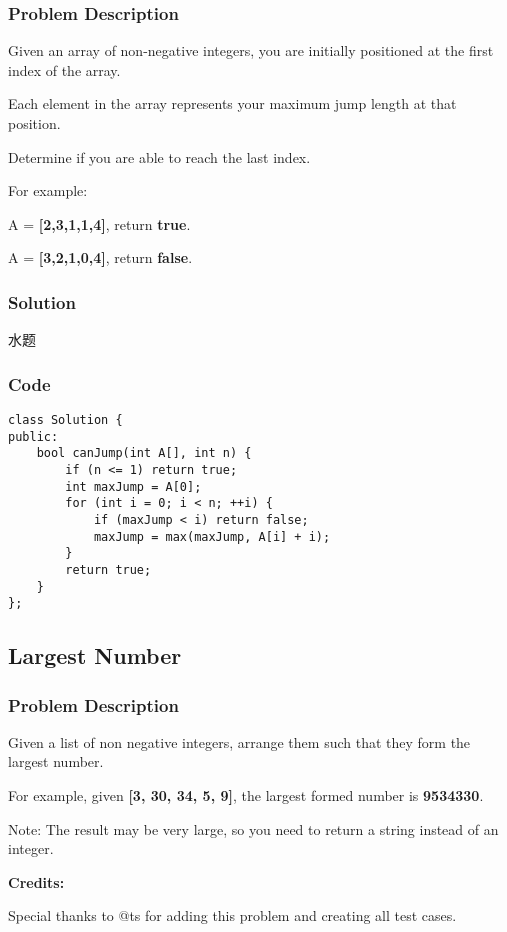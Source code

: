 \documentclass[courier]{article}
\begin{document}
\begin{CJK*}{UTF8}{gkai}
\subsubsection*{Problem Description}
Given an array of non-negative integers, you are initially positioned at the first index of the array.

Each element in the array represents your maximum jump length at that position.

Determine if you are able to reach the last index.

For example:


A = \textbf{[2,3,1,1,4]}, return \textbf{true}.

A = \textbf{[3,2,1,0,4]}, return \textbf{false}.



\subsubsection*{Solution}
水题

\subsubsection*{Code}
\begin{lstlisting}
class Solution {
public:
    bool canJump(int A[], int n) {
        if (n <= 1) return true;
        int maxJump = A[0];
        for (int i = 0; i < n; ++i) {
            if (maxJump < i) return false;
            maxJump = max(maxJump, A[i] + i);
        }
        return true;
    }
}; 
\end{lstlisting}


\subsection{ Largest Number }

\subsubsection*{Problem Description}
Given a list of non negative integers, arrange them such that they form the largest number.

For example, given \textbf{[3, 30, 34, 5, 9]}, the largest formed number is \textbf{9534330}.

Note: The result may be very large, so you need to return a string instead of an integer.

\textbf{Credits:}

Special thanks to @ts for adding this problem and creating all test cases.




\end{CJK*}
\end{document}
